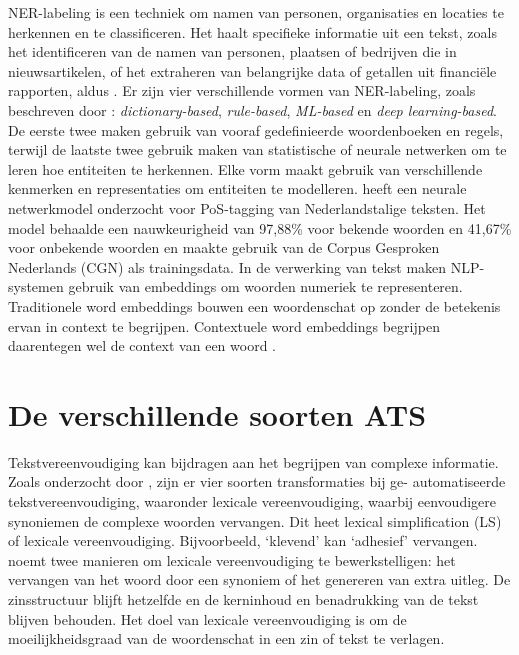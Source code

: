 \medspace

NER-labeling is een techniek om namen van personen, organisaties en locaties te herkennen en te classificeren. Het haalt specifieke informatie uit een tekst, zoals het identificeren van de namen van personen, plaatsen of bedrijven die in nieuwsartikelen, of het extraheren van belangrijke data of getallen uit financiële rapporten, aldus \textcite{Jurafsky2014}. Er zijn vier verschillende vormen van NER-labeling, zoals beschreven door \textcite{Li2018}: \textit{dictionary-based}, \textit{rule-based}, \textit{ML-based} en \textit{deep learning-based}. De eerste twee maken gebruik van vooraf gedefinieerde woordenboeken en regels, terwijl de laatste twee gebruik maken van statistische of neurale netwerken om te leren hoe entiteiten te herkennen. Elke vorm maakt gebruik van verschillende kenmerken en representaties om entiteiten te modelleren. \textcite{Poel2008} heeft een neurale netwerkmodel onderzocht voor PoS-tagging van Nederlandstalige teksten. Het model behaalde een nauwkeurigheid van 97,88\% voor bekende woorden en 41,67\% voor onbekende woorden en maakte gebruik van de Corpus Gesproken Nederlands (CGN) als trainingsdata. In de verwerking van tekst maken NLP-systemen gebruik van embeddings om woorden numeriek te representeren. Traditionele word embeddings bouwen een woordenschat op zonder de betekenis ervan in context te begrijpen. Contextuele word embeddings begrijpen daarentegen wel de context van een woord \autocite{Eisenstein2019}. 

\section{De verschillende soorten ATS}

Tekstvereenvoudiging kan bijdragen aan het begrijpen van complexe informatie. Zoals onderzocht door \textcite{Siddharthan2014}, zijn er vier soorten transformaties bij ge- automatiseerde tekstvereenvoudiging, waaronder lexicale vereenvoudiging, waarbij eenvoudigere synoniemen de complexe woorden vervangen. Dit heet lexical simplification (LS) of lexicale vereenvoudiging. Bijvoorbeeld, ‘klevend’ kan ‘adhesief’ vervangen. \textcite{Kandula2010} noemt twee manieren om lexicale vereenvoudiging te bewerkstelligen: het vervangen van het woord door een synoniem of het genereren van extra uitleg. De zinsstructuur blijft hetzelfde en de kerninhoud en benadrukking van de tekst blijven behouden. Het doel van lexicale vereenvoudiging is om de moeilijkheidsgraad van de woordenschat in een zin of tekst te verlagen.

